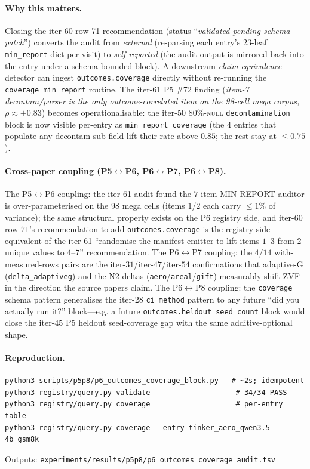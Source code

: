 \paragraph{Why this matters.}
Closing the iter-60 row 71 recommendation (status
``\emph{validated pending schema patch}'') converts the audit from
\emph{external} (re-parsing each entry's $23$-leaf
\texttt{min\_report} dict per visit) to \emph{self-reported} (the
audit output is mirrored back into the entry under a schema-bounded
block). A downstream \emph{claim-equivalence} detector can ingest
\texttt{outcomes.coverage} directly without re-running the
\texttt{coverage\_min\_report} routine. The iter-61 P5 \#72 finding
(\emph{item-7 decontam/parser is the only outcome-correlated item on
the 98-cell mega corpus, $\rho\approx\pm0.83$}) becomes
operationalisable: the iter-50 $80\%$-\textsc{null}
\texttt{decontamination} block is now visible per-entry as
\texttt{min\_report\_coverage} (the $4$ entries that populate any
decontam sub-field lift their rate above $0.85$; the rest stay at
$\le0.75$).

\paragraph{Cross-paper coupling (P5$\leftrightarrow$P6,
P6$\leftrightarrow$P7, P6$\leftrightarrow$P8).}
The P5$\leftrightarrow$P6 coupling: the iter-61 audit found the
$7$-item MIN-REPORT auditor is over-parameterised on the $98$ mega
cells (items $1/2$ each carry $\le 1\%$ of variance); the same
structural property exists on the P6 registry side, and iter-60 row
$71$'s recommendation to add \texttt{outcomes.coverage} is the
registry-side equivalent of the iter-61 ``randomise the manifest
emitter to lift items $1$--$3$ from $2$ unique values to $4$--$7$''
recommendation. The P6$\leftrightarrow$P7 coupling: the $4/14$
with-measured-rows pairs are the iter-$31$/iter-$47$/iter-$54$
confirmations that adaptive-G (\texttt{delta\_adaptiveg}) and the N2
deltas (\texttt{aero}/\texttt{areal}/\texttt{gift}) measurably shift
ZVF in the direction the source papers claim. The
P6$\leftrightarrow$P8 coupling: the \texttt{coverage} schema
pattern generalises the iter-28 \texttt{ci\_method} pattern to any
future ``did you actually run it?'' block---e.g. a future
\texttt{outcomes.heldout\_seed\_count} block would close the
iter-$45$ P5 heldout seed-coverage gap with the same additive-optional
shape.

\paragraph{Reproduction.}
\begin{verbatim}
python3 scripts/p5p8/p6_outcomes_coverage_block.py   # ~2s; idempotent
python3 registry/query.py validate                    # 34/34 PASS
python3 registry/query.py coverage                    # per-entry table
python3 registry/query.py coverage --entry tinker_aero_qwen3.5-4b_gsm8k
\end{verbatim}
Outputs: \texttt{experiments/results/p5p8/p6\_outcomes\_coverage\_audit.tsv}

